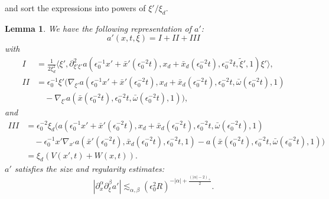 \documentclass{amsart}
\newtheorem{lemma}[theorem]{Lemma}
\theoremstyle{definition}
\begin{document}
and sort the expressions into powers of $\xi'/\xi_d$.
\begin{lemma}
We have the following representation of $a'$:
\begin{equation*}
a'(x,t,\xi) = I + II + III 
\end{equation*}
with
\begin{equation*}
\begin{split}
I &= \frac{1}{2 \xi_d^2} \langle \xi', \partial^2_{\xi' \xi'} a(\epsilon_0^{-1} x'+\bar{x}'(\epsilon_0^{-2} t),x_d+\bar{x}_d(\epsilon_0^{-2} t), \epsilon_0^{-2} t, \tilde{\xi}', 1) \xi' \rangle, \\
II &= \epsilon_0^{-1} \xi' (\nabla_{\xi'} a(\epsilon_0^{-1} x'+\bar{x}'(\epsilon_0^{-2} t),x_d+\bar{x}_d(\epsilon_0^{-2} t),\epsilon_0^{-2} t, \bar{\omega}(\epsilon_0^{-2} t),1) \\
&\quad - \nabla_{\xi'} a(\bar{x}(\epsilon_0^{-2} t),\epsilon_0^{-2} t,\bar{\omega}(\epsilon_0^{-2} t),1)),
\end{split}
\end{equation*}
and
\begin{equation*}
\begin{split}
III &= \epsilon_0^{-2} \xi_d (a(\epsilon_0^{-1} x' + \bar{x}'(\epsilon_0^{-2} t), x_d + \bar{x}_d(\epsilon_0^{-2} t), \epsilon_0^{-2} t, \bar{\omega}(\epsilon_0^{-2} t),1) \\
&\quad - \epsilon_0^{-1} x' \nabla_{x'} a(\bar{x}'(\epsilon_0^{-2} t),\bar{x}_d(\epsilon_0^{-2} t),\epsilon_0^{-2} t,1) - a(\bar{x}(\epsilon_0^{-2} t),\epsilon_0^{-2} t, \bar{\omega}(\epsilon_0^{-2} t),1)) \\
&= \xi_d (V(x',t) + W(x,t)).
\end{split}
\end{equation*}
$a'$ satisfies the size and regularity estimates:
\begin{equation*}
|\partial_x^{\alpha} \partial_{\xi}^{\beta} a'| \lesssim_{\alpha,\beta} (\epsilon_0^2 R)^{-|\alpha| + \frac{(|\alpha|-2)_+}{2}}.
\end{equation*}
\end{lemma}
\end{document}
